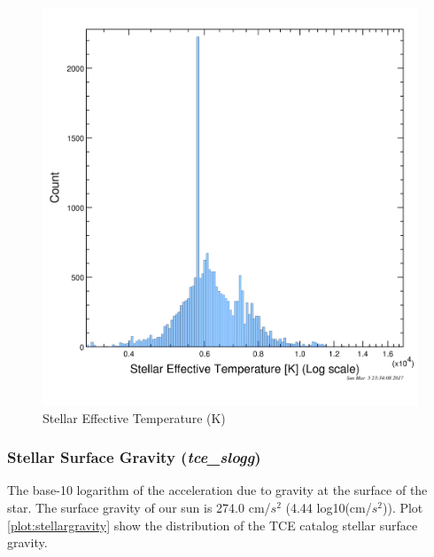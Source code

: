 \begin{figure}[!h]
\begin{center}
        \includegraphics[width=0.5\textheight]{img/stellartemp.png}
        \caption{Stellar Effective Temperature (K)}  \label{plot:stellartemp}
\end{center}
\end{figure}

\subsubsection{Stellar Surface Gravity (\emph{tce\_slogg})}
The base-10 logarithm of the acceleration due to gravity at the surface of the star. The surface gravity of our sun is 274.0 cm/$s^{2}$ (4.44 log10(cm/$s^{2}$)). Plot \ref{plot:stellargravity} show the distribution of the TCE catalog stellar surface gravity. 

